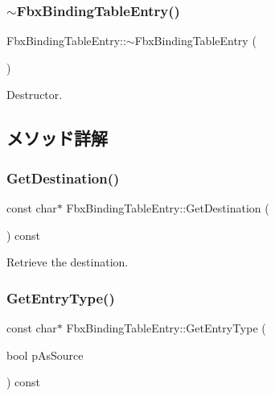 \subsubsection{\texorpdfstring{$\sim$\+Fbx\+Binding\+Table\+Entry()}{~FbxBindingTableEntry()}}
{\footnotesize\ttfamily Fbx\+Binding\+Table\+Entry\+::$\sim$\+Fbx\+Binding\+Table\+Entry (\begin{DoxyParamCaption}{ }\end{DoxyParamCaption})}



Destructor. 



\subsection{メソッド詳解}
\mbox{\label{class_fbx_binding_table_entry_acee5bfe3f994725cca8670d2974b654a}} 
\subsubsection{\texorpdfstring{Get\+Destination()}{GetDestination()}}
{\footnotesize\ttfamily const char$\ast$ Fbx\+Binding\+Table\+Entry\+::\+Get\+Destination (\begin{DoxyParamCaption}{ }\end{DoxyParamCaption}) const}



Retrieve the destination. 

\mbox{\label{class_fbx_binding_table_entry_a9c116ecffcff4117ff1d3c69cf414b70}} 
\subsubsection{\texorpdfstring{Get\+Entry\+Type()}{GetEntryType()}}
{\footnotesize\ttfamily const char$\ast$ Fbx\+Binding\+Table\+Entry\+::\+Get\+Entry\+Type (\begin{DoxyParamCaption}\item[{bool}]{p\+As\+Source }\end{DoxyParamCaption}) const}


